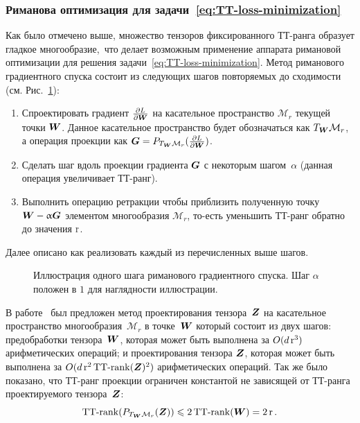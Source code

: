 \subsubsection{Риманова оптимизация для задачи~\eqref{eq:TT-loss-minimization} \label{sec:exm-riemannian-optimization}}

Как было отмечено выше, множество тензоров фиксированного ТТ-ранга образует гладкое многообразие, что делает возможным применение аппарата римановой оптимизации для решения задачи~\eqref{eq:TT-loss-minimization}.
Метод риманового градиентного спуска состоит из следующих шагов повторяемых до сходимости (см. Рис.~\ref{fig:riemannian-illustration}):
\begin{enumerate}
\item Спроектировать градиент $\frac{\partial L}{\partial \boldsymbol{W}}$ на касательное пространство $\mathcal{M}_r$ текущей точки $\boldsymbol{W}$. Данное касательное пространство будет обозначаться как $T_{\boldsymbol{W}} \mathcal{M}_r$, а операция проекции как $\boldsymbol{G} = P_{T_{\boldsymbol{W}} \mathcal{M}_r}(\frac{\partial L}{\partial \boldsymbol{W}})$.
\item Сделать шаг вдоль проекции градиента $\boldsymbol{G}$ с некоторым шагом~$\alpha$ (данная операция увеличивает ТТ-ранг).
\item Выполнить операцию ретракции чтобы приблизить полученную точку $\boldsymbol{W} - \upalpha \boldsymbol{G}$  элементом многообразия $\mathcal{M}_r$, то-есть уменьшить ТТ-ранг обратно до значения $\operatorname{r}$.
\end{enumerate}
Далее описано как реализовать каждый из перечисленных выше шагов.

\begin{figure}[t]
\begin{center}
  \resizebox{0.5\textwidth}{!}{
  \def\svgwidth{7cm}
  \normalsize
  
  }
  \caption{Иллюстрация одного шага риманового градиентного спуска. Шаг $\alpha$ положен в $1$ для наглядности иллюстрации. \label{fig:riemannian-illustration}}
  \end{center}
\end{figure}

В работе~\cite{lubich2015time} был предложен метод проектирования тензора~$\boldsymbol{Z}$ на касательное пространство многообразия~$\mathcal{M}_r$ в точке~$\boldsymbol{W}$ который состоит из двух шагов: предобработки тензора~$\boldsymbol{W}$, которая может быть выполнена за $O(d \operatorname{r}^3)$ арифметических операций; и проектирования тензора $\boldsymbol{Z}$, которая может быть выполнена за $O(d \operatorname{r}^2 \operatorname{TT-rank}(\boldsymbol{Z})^2)$ арифметических операций.
Так же было показано, что ТТ-ранг проекции ограничен константой не зависящей от ТТ-ранга проектируемого тензора~$\boldsymbol{Z}$:
\begin{equation*}
   \operatorname{TT-rank}(P_{T_{\boldsymbol{W}} \mathcal{M}_r}(\boldsymbol{Z})) \leqslant 2 \operatorname{TT-rank}(\boldsymbol{W}) = 2 \operatorname{r}.
\end{equation*}

